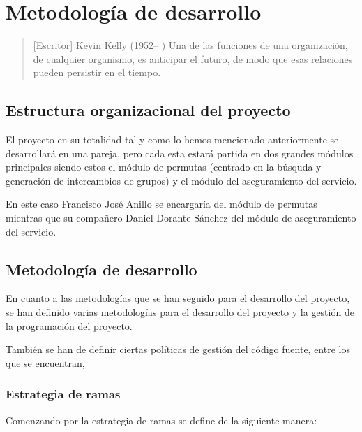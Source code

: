 \chapter{Metodología de desarrollo}
 
\begin{quotation} [Escritor] {Kevin Kelly (1952-- )}
Una de las funciones de una organización, de cualquier organismo, es anticipar el futuro, de modo que esas relaciones pueden persistir en el tiempo.
\end{quotation}

\begin{abstract}
Para realizar el proyecto ha sido necesario seguir una serie de procedimientos para el correcto desarrollo del mismo.
\end{abstract}

\section{Estructura organizacional del proyecto}

El proyecto en su totalidad tal y como lo hemos mencionado anteriormente se desarrollará en una pareja, pero cada esta estará partida en dos grandes módulos principales siendo estos el módulo de permutas (centrado en la búsquda y generación de intercambios de grupos) y el módulo del aseguramiento del servicio.

En este caso Francisco José Anillo se encargaría del módulo de permutas mientras que su compañero Daniel Dorante Sánchez del módulo de aseguramiento del servicio.

\section{Metodología de desarrollo}

En cuanto a las metodologías que se han seguido para el desarrollo del proyecto, se han definido varias metodologías para el desarrollo del proyecto y la gestión de la programación del proyecto.

También se han de definir ciertas políticas de gestión del código fuente, entre los que se encuentran, 

\subsection{Estrategia de ramas}

Comenzando por la estrategia de ramas se define de la siguiente manera:


